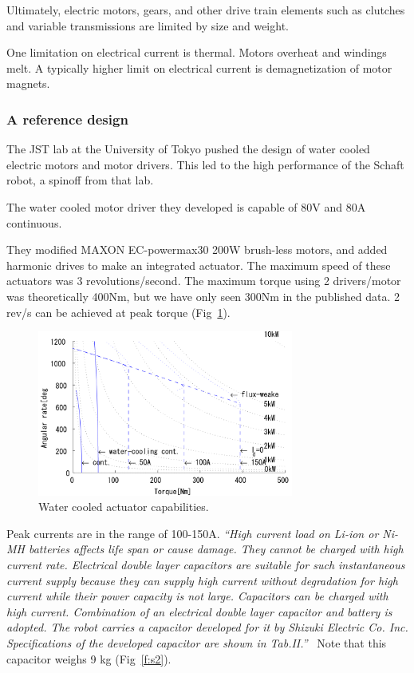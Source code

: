 \documentclass[letterpaper,12pt,fullpage]{article}
\begin{document}
Ultimately, electric motors, gears, and other drive train elements such
as clutches and variable transmissions are limited by size and weight.

One limitation on electrical current
is thermal. Motors overheat and windings melt.
A typically 
higher limit on electrical current is demagnetization of motor magnets.

\subsubsection{A reference design}

The JST lab at the University of Tokyo pushed the design of water
cooled electric motors and motor drivers. This led to the high
performance of the Schaft robot, a spinoff from that lab.

The water cooled motor driver they developed is capable of 80V and
80A continuous.~\cite{IEEE05649683}

They modified
MAXON EC-powermax30 200W brush-less motors, and added harmonic drives
to make an integrated actuator.
The maximum speed of these actuators was 3 revolutions/second.
The maximum torque using 2 drivers/motor was theoretically 400Nm, but
we have only seen 300Nm in the published data. 2 rev/s can be achieved
at peak torque (Fig~\ref{f:s1}).~\cite{IEEE05649683}

\begin{figure}[t]
\centering
\includegraphics[width=0.75\textwidth]{tech-figs/s1}
\caption{Water cooled actuator capabilities.}
\label{f:s1}
\end{figure}

Peak currents are in the range of 100-150A.
{\it
``High current load on Li-ion or Ni-MH batteries affects life
span or cause damage. They cannot be charged with high
current rate. Electrical double layer capacitors are suitable for
such instantaneous current supply because they can supply
high current without degradation for high current while
their power capacity is not large. Capacitors can be charged
with high current. Combination of an electrical double layer
capacitor and battery is adopted. The robot carries a capacitor
developed for it by Shizuki Electric Co. Inc. Specifications of
the developed capacitor are shown in Tab.II.''}~\cite{IEEE05649683}
Note that this capacitor weighs 9 kg (Fig~\ref{f:s2}).
\end{document}
